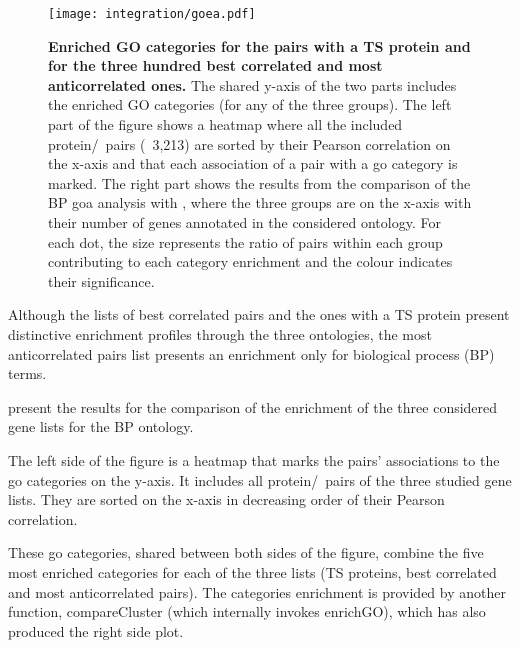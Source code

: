     \begin{sidewaysfigure}
        \texttt{[image: integration/goea.pdf]}\centering
        \vspace{-3mm}
        \caption[Enriched GO categories for the pairs with a TS proteins and for the
        three hundred best correlated and most anticorrelated
        ones]{\label{fig:goares}%
        \textbf{Enriched GO categories for the pairs with a TS protein
        and for the three hundred best correlated
        and most anticorrelated ones.}
        The shared y-axis of the two parts includes the enriched GO categories
        (for any of the three groups).
        The left part of the figure shows
        a heatmap where all the included protein/\mRNA\ pairs (\ie\ 3,213)
        are sorted by their Pearson correlation on the x-axis and
        that each association of a pair with a \gls{go} category is marked.
        The right part shows the results from the comparison
        of the BP \gls{goa} analysis with ,
        where the three groups are on the x-axis with their number of genes
        annotated in the considered ontology.
        For each dot, the size represents the ratio of pairs within each group
        contributing to each category enrichment
        and the colour indicates their significance.
        }
    \end{sidewaysfigure}


Although the lists of best correlated pairs and
the ones with a \gls{TS} protein present distinctive enrichment profiles
through the three ontologies,
the most anticorrelated pairs list presents
an enrichment only for biological process (BP) terms.

 present the results for
the comparison of the enrichment of the three considered gene lists
for the BP ontology.

The left side of the figure is a heatmap
that marks the pairs' associations to the \gls{go} categories on the y-axis.
It includes all protein/\mRNA\ pairs of the three studied gene lists.
They are sorted on the x-axis in decreasing order of their Pearson correlation.

These \gls{go} categories, shared between both sides of the figure,
combine the five most enriched categories
for each of the three lists (\gls{TS} proteins, best correlated
and most anticorrelated pairs).
The categories enrichment is provided by another  function,
\textsf{compareCluster} (which internally invokes \textsf{enrichGO}),
which has also produced the right side plot.\\
\vspace{-\baselineskip}

